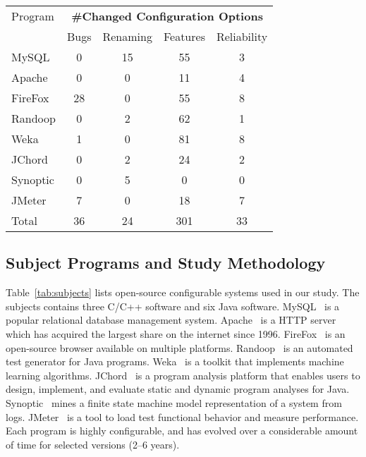 \begin{table}[t]
\vspace{1mm}
\centering
\small{
\setlength{\tabcolsep}{.50\tabcolsep}
\begin{tabular}{|l|c|c|c|c|}
\hline
 Program & \multicolumn{4}{|c|}{\textbf{\#Changed Configuration Options}} \\
 \cline{2-5}
 & Bugs & Renaming & Features & Reliability \\
 \hline
 \hline
 MySQL & 0 & 15 & 55 & 3 \\
 Apache& 0 & 0 & 11 & 4 \\
 FireFox& 28 & 0 & 55 & 8 \\
 Randoop & 0  & 2 & 62  & 1\\
 Weka & 1  & 0 & 81  & 8 \\
 JChord & 0  & 2 & 24 & 2\\ %
 Synoptic & 0 &  5 & 0 & 0\\
 JMeter & 7  & 0 & 18 & 7 \\
\hline
\hline
 Total & 36 & 24 & 301 & 33 \\
\hline
\end{tabular}
}
\vspace{-2mm}
\end{table}


\subsection{Subject Programs and Study Methodology}


Table~\ref{tab:subjects} lists
\studysubjnum open-source configurable systems used in our
study. The \studysubjnum subjects contains
three C/C++ software and six Java software.
MySQL~\cite{mysql}  is a popular relational database management
system. Apache~\cite{apache} is a HTTP server which has acquired
the largest share on the internet since 1996. FireFox~\cite{firefox}
is an open-source browser available on multiple platforms.
Randoop~\cite{randoop} is an automated test generator for Java
programs. Weka~\cite{weka} is a toolkit that implements machine
learning algorithms. JChord~\cite{jchord} is a program analysis platform that
enables users to design, implement, and evaluate static and
dynamic program analyses for Java. Synoptic~\cite{synoptic} mines a
finite state machine model representation of a system from
logs. JMeter~\cite{jmeter} is a tool to load test functional
behavior and measure performance.
Each program is highly configurable, and has evolved over
a considerable amount of time for selected versions ({2--6} years).



